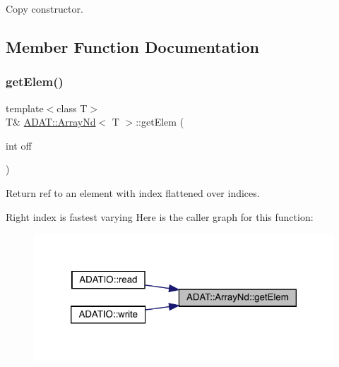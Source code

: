 Copy constructor. 



\subsection{Member Function Documentation}
\mbox{\label{classADAT_1_1ArrayNd_abc5c56420a9625b236d4521acb083de2}} 
\subsubsection{\texorpdfstring{getElem()}{getElem()}\hspace{0.1cm}{\footnotesize\ttfamily [1/6]}}
{\footnotesize\ttfamily template$<$class T$>$ \\
T\& \mbox{\hyperlink{classADAT_1_1ArrayNd}{A\+D\+A\+T\+::\+Array\+Nd}}$<$ T $>$\+::get\+Elem (\begin{DoxyParamCaption}\item[{int}]{off }\end{DoxyParamCaption})\hspace{0.3cm}{\ttfamily [inline]}}



Return ref to an element with index flattened over indices. 

Right index is fastest varying Here is the caller graph for this function\+:
\nopagebreak
\begin{figure}[H]
\begin{center}
\leavevmode
\includegraphics[width=320pt]{d1/db2/classADAT_1_1ArrayNd_abc5c56420a9625b236d4521acb083de2_icgraph}
\end{center}
\end{figure}
\mbox{\label{classADAT_1_1ArrayNd_abc5c56420a9625b236d4521acb083de2}} 
